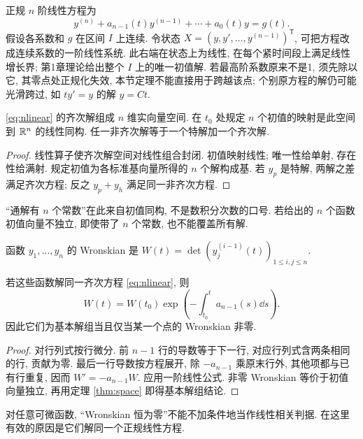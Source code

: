 正规 $n$ 阶线性方程为
\begin{equation}\label{eq:nlinear}
y^{(n)}+a_{n-1}(t)y^{(n-1)}+\cdots+a_0(t)y=g(t).
\end{equation}
假设各系数和 $g$ 在区间 $I$ 上连续. 令状态 $X=(y,y',\ldots,y^{(n-1)})^{\mathsf T}$, 可把方程改成连续系数的一阶线性系统. 此右端在状态上为线性, 在每个紧时间段上满足线性增长界; 第1章理论给出整个 $I$ 上的唯一初值解. 若最高阶系数原来不是1, 须先除以它, 其零点处正规化失效, 本节定理不能直接用于跨越该点; 个别原方程的解仍可能光滑跨过, 如 $ty'=y$ 的解 $y=Ct$.
\begin{theorem}\label{thm:space}
\eqref{eq:nlinear} 的齐次解组成 $n$ 维实向量空间. 在 $t_0$ 处规定 $n$ 个初值的映射是此空间到 $\mathbb R^n$ 的线性同构. 任一非齐次解等于一个特解加一个齐次解.
\end{theorem}
\begin{proof}
线性算子使齐次解空间对线性组合封闭. 初值映射线性; 唯一性给单射, 存在性给满射. 规定初值为各标准基向量所得的 $n$ 个解构成基. 若 $y_p$ 是特解, 两解之差满足齐次方程; 反之 $y_p+y_h$ 满足同一非齐次方程.
\end{proof}
“通解有 $n$ 个常数”在此来自初值同构, 不是数积分次数的口号. 若给出的 $n$ 个函数初值向量不独立, 即使带了 $n$ 个常数, 也不能覆盖所有解.
\begin{definition}
函数 $y_1,\ldots,y_n$ 的 Wronskian 是 $W(t)=\det(y_j^{(i-1)}(t))_{1\le i,j\le n}$.
\end{definition}
\begin{theorem}[Abel 公式]
若这些函数解同一齐次方程 \eqref{eq:nlinear}, 则
\[
W(t)=W(t_0)\exp\left(-\int_{t_0}^t a_{n-1}(s)\dd s\right).
\]
因此它们为基本解组当且仅当某一个点的 Wronskian 非零.
\end{theorem}
\begin{proof}
对行列式按行微分. 前 $n-1$ 行的导数等于下一行, 对应行列式含两条相同的行, 贡献为零. 最后一行导数按方程展开, 除 $-a_{n-1}$ 乘原末行外, 其他项都与已有行重复, 因而 $W'=-a_{n-1}W$. 应用一阶线性公式. 非零 Wronskian 等价于初值向量独立, 再用定理 \ref{thm:space} 即得基本解组结论.
\end{proof}
对任意可微函数, “Wronskian 恒为零”不能不加条件地当作线性相关判据. 在这里有效的原因是它们解同一个正规线性方程.

